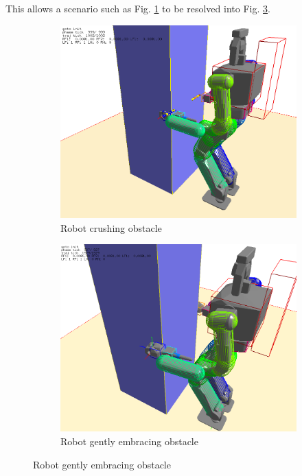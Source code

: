 \documentclass[letterpaper, 10 pt, conference]{ieeeconf}  %
\begin{document}
This allows a scenario such as Fig. \ref{fig:grab_collide_full} to be resolved into Fig. \ref{fig:grab_resolved_full}.

\begin{figure}[h]
    \begin{subfigure}[h]{\columnwidth}
        \includegraphics[width=\columnwidth]{pictures/grab_collide}
        \caption{Robot crushing obstacle}
        \label{fig:grab_collide_full}
    \end{subfigure}
    \begin{subfigure}[h]{\columnwidth}
        \includegraphics[width=\columnwidth]{pictures/grab_resolved}
        \caption{Robot gently embracing obstacle}
        \label{fig:grab_resolved_full}
    \end{subfigure}
\end{figure}
\end{document}
